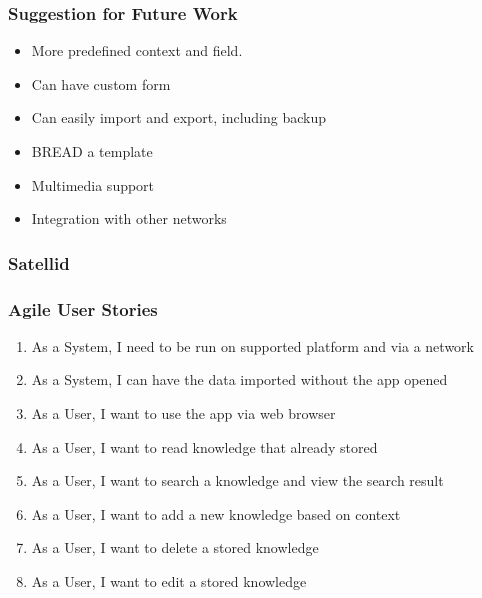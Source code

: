\documentclass[10pt, compress]{beamer}
\begin{document}
\begin{frame}[fragile]
  \frametitle{Suggestion for Future Work}

  \begin{itemize} \itemsep0pt
    \item More predefined context and field.
    \item Can have custom form
    \item Can easily import and export, including backup
    \item \textsc{BREAD} a template
    \item Multimedia support
    \item Integration with other networks
  \end{itemize}

\end{frame}






\begin{frame}[fragile]
  \frametitle{Satellid}

  \begin{figure}[ht]
    \centering
    \vspace{-1cm}
    \label{fig:satellite}
  \end{figure}

\end{frame}


\begin{frame}[fragile]
  \frametitle{Agile User Stories}

  \begin{enumerate} \itemsep0pt
    \item As a System, I need to be run on supported platform and via a network
    \item As a System, I can have the data imported without the app opened
    \item As a User, I want to use the app via web browser
    \item As a User, I want to read knowledge that already stored
    \item As a User, I want to search a knowledge and view the search result
    \item As a User, I want to add a new knowledge based on context
    \item As a User, I want to delete a stored knowledge
    \item As a User, I want to edit a stored knowledge
  \end{enumerate}

\end{frame}
\end{document}
